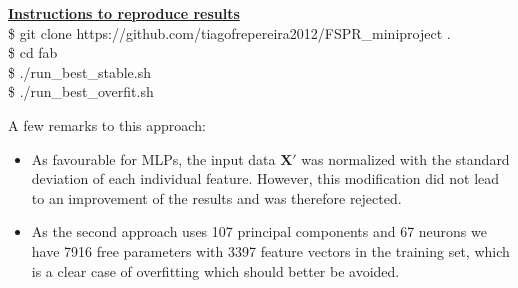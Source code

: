 \documentclass[a4paper,10pt,fleqn]{article}
\newcommand{\note}[1]{
\begin{boxitpara}{}%
\textbf{\underline{Instructions to reproduce results}} #1
\end{boxitpara}}
\begin{document}
\note{\\ 
\$ git clone https://github.com/tiagofrepereira2012/FSPR\_miniproject . \\
\$ cd fab \\
\$ ./run\_best\_stable.sh \\
\$ ./run\_best\_overfit.sh 
}

\vspace{1cm}
A few remarks to this approach:

\begin{itemize}
	\item As favourable for MLPs, the input data $\mathbf{X}'$ was normalized with the standard deviation of each individual feature. However, this modification did not lead to an improvement of the results and was therefore rejected.
	\item As the second approach uses 107 principal components and 67 neurons we have 7916 free parameters with 3397 feature vectors in the training set, which is a clear case of overfitting which should better be avoided.
\end{itemize}
\end{document}
